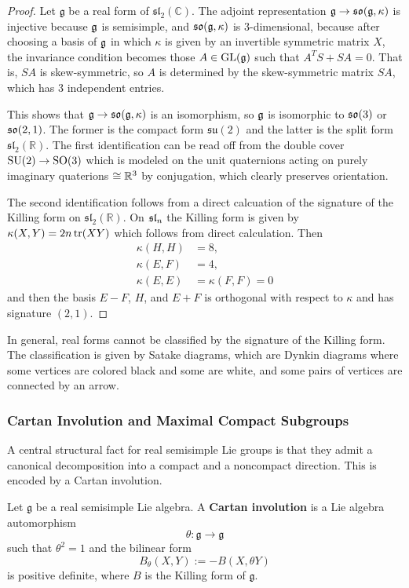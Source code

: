 \documentclass[12pt]{article}
\begin{document}
\begin{proof}
    Let $\mathfrak g$ be a real form of $\mathfrak{sl}_2(\mathbb C)$. The adjoint representation $\mf g \to \so(\mf g, \kappa)$ is injective because $\mf g$ is semisimple, and $\so(\mf g, \kappa)$ is 3-dimensional, because after choosing a basis of $\mf g$ in which $\kappa$ is given by an invertible symmetric matrix $X$, the invariance condition becomes those $A\in \GL(\mf g)$ such that $A^TS + SA = 0$. That is, $SA$ is skew-symmetric, so $A$ is determined by the skew-symmetric matrix $SA$, which has 3 independent entries.

    This shows that $\mf g \to \mf{so}(\mf g, \kappa)$ is an isomorphism, so $\mf g$ is isomorphic to $\so(3)$ or $\so(2,1)$. The former is the compact form $\mathfrak{su}(2)$ and the latter is the split form $\mathfrak{sl}_2(\mathbb R)$. The first identification can be read off from the double cover $\SU(2)\to \SO(3)$ which is modeled on the unit quaternions acting on purely imaginary quaterions $\cong \R^3$ by conjugation, which clearly preserves orientation.

    The second identification follows from a direct calcuation of the signature of the Killing form on $\mathfrak{sl}_2(\mathbb R)$. On $\sl_n$ the Killing form is given by $\kappa(X,Y)=2n\tr(XY)$ which follows from direct calculation. Then \begin{align*}
        \kappa(H,H) & = 8,              \\
        \kappa(E,F) & = 4,              \\
        \kappa(E,E) & = \kappa(F,F) = 0
    \end{align*} and then the basis $E-F$, $H$, and $E+F$ is orthogonal with respect to $\kappa$ and has signature $(2,1)$.
\end{proof}

In general, real forms cannot be classified by the signature of the Killing form. The classification is given by Satake diagrams, which are Dynkin diagrams where some vertices are colored black and some are white, and some pairs of vertices are connected by an arrow.


\subsubsection{Cartan Involution and Maximal Compact Subgroups}

A central structural fact for real semisimple Lie groups is that they admit a canonical decomposition into a compact and a noncompact direction. This is encoded by a Cartan involution.
\begin{definition}
    Let $\mathfrak g$ be a real semisimple Lie algebra. A \textbf{Cartan involution} is a Lie algebra automorphism
    \[
        \theta : \mathfrak g \to \mathfrak g
    \]
    such that $\theta^2 = 1$ and the bilinear form
    \[
        B_\theta(X,Y) := -B(X,\theta Y)
    \]
    is positive definite, where $B$ is the Killing form of $\mathfrak g$.
\end{definition}
\end{document}
